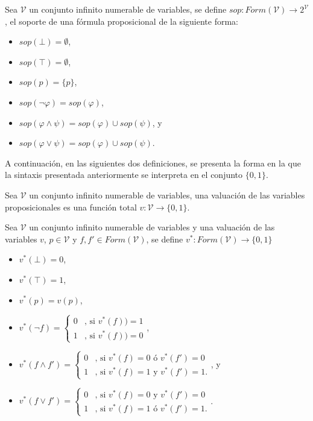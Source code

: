 \begin{definition}
Sea $\mathcal{V}$ un conjunto infinito numerable de variables, se define $\mathit{sop}: \mathit{Form} (\mathcal{V}) \to 2^\mathcal{V}$, el soporte de una fórmula proposicional de la siguiente forma:
\begin{itemize}
\item $\mathit{sop} (\bot) = \emptyset$,
\item $\mathit{sop} (\top) = \emptyset$,
\item $\mathit{sop} (p) = \{p\}$,
\item $\mathit{sop} (\neg \varphi) = \mathit{sop} (\varphi)$,
\item $\mathit{sop} (\varphi \land \psi) = \mathit{sop} (\varphi) \cup \mathit{sop} (\psi)$, y
\item $\mathit{sop} (\varphi \lor \psi) = \mathit{sop} (\varphi) \cup \mathit{sop} (\psi)$.
\end{itemize}
\end{definition}

A continuación, en las siguientes dos definiciones, se presenta la forma en la que la sintaxis presentada anteriormente se interpreta en el conjunto $\{0, 1\}$.

\begin{definition}
Sea $\mathcal{V}$ un conjunto infinito numerable de variables, una valuación de las variables proposicionales es una función total $v: \mathcal{V} \to \{0, 1\}$.
\end{definition}

\begin{definition}
Sea $\mathcal{V}$ un conjunto infinito numerable de variables y una valuación de las variables $v$, $p \in \mathcal{V}$ y $f, f' \in \mathit{Form}(\mathcal{V})$,  se define $v^*: \mathit{Form}(\mathcal{V}) \to \{0, 1\}$ 
\begin{itemize}
\item $v^*(\bot) = 0$,
\item $v^*(\top) = 1$,
\item $v^*(p) = v(p)$,
\item $v^* (\neg f) = \left\{\begin{array}{ll}0 & \mbox{, si $v^*(f)) = 1$}\\ 1 & \mbox{, si $v^*(f)) = 0$}\end{array}\right.$,
\item $v^* (f \land f') =  \left\{\begin{array}{ll}0 & \mbox{, si $v^*(f) = 0$ ó $v^*(f') = 0$}\\1 & \mbox{, si $v^*(f) = 1$ y $v^*(f') = 1$.}\end{array}\right.$, y
\item $v^* (f \lor f') =  \left\{\begin{array}{ll}0 & \mbox{, si $v^*(f) = 0$ y $v^*(f') = 0$}\\1 & \mbox{, si $v^*(f) = 1$ ó $v^*(f') = 1$.}\end{array}\right.$.
\end{itemize}
\end{definition}

